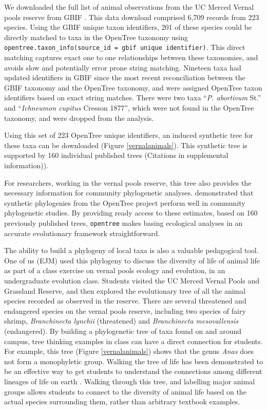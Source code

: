 \documentclass[oupdraft]{sysbio_sse}
\begin{document}
We downloaded the full list of animal observations from the UC Merced Vernal pools reserve from GBIF \citep{gbif_secretariat_gbif_2019}. This data download comprised 6,709 records from 223 species. Using the GBIF unique taxon identifiers, 201 of these species could be directly matched to taxa in the OpenTree taxonomy using \texttt{opentree.taxon\_info(source\_id = {gbif unique identifier})}. This direct matching captures exact one to one relationships between these taxonomies, and avoids slow and potentially error prone string matching. Nineteen taxa had updated identifiers in GBIF since the most recent reconciliation between the GBIF taxonomy and the OpenTree taxonomy, and were assigned OpenTree taxon identifiers based on exact string matches. There were two taxa ``\textit{P. abortivum} St.'' and ``\textit{Ichneumon cupitus} Cresson 1877'', which were not found in the OpenTree taxonomy, and were dropped from the analysis.


Using this set of 223 OpenTree unique identifiers, an induced synthetic tree for these taxa can be downloaded (Figure \ref{vernalanimals}). This synthetic tree is supported by 160 individual published trees (Citations in supplemental information)).


For researchers, working in the vernal pools reserve, this tree also provides the necessary information for community phylogenetic analyses. \citet{li_for_2019} demonstrated that synthetic phylogenies from the OpenTree project perform well in community phylogenetic studies. By providing ready access to these estimates, based on 160 previously published trees, \texttt{opentree} makes basing ecological analyses in an accurate evolutionary framework straightforward.


The ability to build a phylogeny of local taxa is also a valuable pedagogical tool. One of us (EJM) used this phylogeny to discuss the diversity of life of animal life as part of a class exercise on vernal pools ecology and evolution, in an undergraduate evolution class. 
Students visited the UC Merced Vernal Pools and Grassland Reserve, and then explored the evolutionary tree of all the animal species recorded as observed in the reserve. 
There are several threatened and endangered species on the vernal pools reserve, including two species of fairy shrimp, \textit{Branchinecta lynchii} (threatened) and \textit{Branchinecta mesovallensis} (endangered). 
By building a phylogenetic tree of taxa found on and around campus, tree thinking examples in class can have a direct connection for students. For example, this tree (Figure \ref{vernalanimals}) shows that the genus \textit{Anas} does not form a monophyletic group. Walking the tree of life has been demonstrated to be an effective way to get students to understand the connections among different lineages of life on earth \citep{ballen_walking_2017}. Walking through this tree, and labelling major animal groups allows students to connect to the diversity of animal life based on the actual species surrounding them, rather than arbitrary textbook examples.
\end{document}
